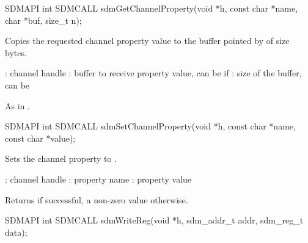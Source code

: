 \documentclass[a4paper,12pt,twoside,extrafontsizes]{memoir}
\begin{document}

\begin{cfuncprototype}
SDMAPI int SDMCALL sdmGetChannelProperty(void *h, const char *name, char *buf, size_t n);
\end{cfuncprototype}

\begin{funcdescr}
	Copies the requested channel property value to the buffer pointed by  of size  bytes.
\end{funcdescr}

\begin{funcparams}
	: channel handle
	: buffer to receive property value, can be  if 
	: size of the buffer, can be 
\end{funcparams}

\begin{funcret}
	As in .
\end{funcret}



\begin{cfuncprototype}
SDMAPI int SDMCALL sdmSetChannelProperty(void *h, const char *name, const char *value);
\end{cfuncprototype}

\begin{funcdescr}
	Sets the channel property  to .
\end{funcdescr}

\begin{funcparams}
	: channel handle
	: property name
	: property value
\end{funcparams}

\begin{funcret}
	Returns  if successful, a non-zero value otherwise.
\end{funcret}



\begin{cfuncprototype}
SDMAPI int SDMCALL sdmWriteReg(void *h, sdm_addr_t addr, sdm_reg_t data);
\end{cfuncprototype}
\end{document}
